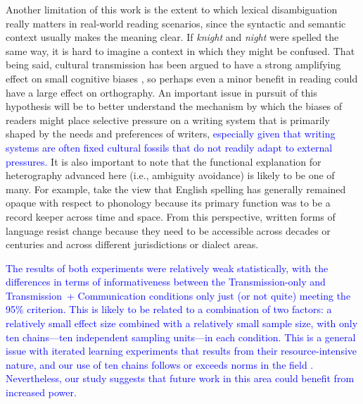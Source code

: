 \documentclass[doc,biblatex]{apa7}
\newcommand\newmaterial[1]{\textcolor{blue}{#1}}
\begin{document}
Another limitation of this work is the extent to which lexical disambiguation really matters in real-world reading scenarios, since the syntactic and semantic context usually makes the meaning clear. If \textit{knight} and \textit{night} were spelled the same way, it is hard to imagine a context in which they might be confused. That being said, cultural transmission has been argued to have a strong amplifying effect on small cognitive biases \parencite{Thompson:2016}, so perhaps even a minor benefit in reading could have a large effect on orthography. An important issue in pursuit of this hypothesis will be to better understand the mechanism by which the biases of readers might place selective pressure on a writing system that is primarily shaped by the needs and preferences of writers, \newmaterial{especially given that writing systems are often fixed cultural fossils that do not readily adapt to external pressures.} It is also important to note that the functional explanation for heterography advanced here (i.e., ambiguity avoidance) is likely to be one of many. For example, \textcite{Stenroos:2016} take the view that English spelling has generally remained opaque with respect to phonology because its primary function was to be a record keeper across time and space. From this perspective, written forms of language resist change because they need to be accessible across decades or centuries and across different jurisdictions or dialect areas.

\newmaterial{The results of both experiments were relatively weak statistically, with the differences in terms of informativeness between the Transmission-only and Transmission~+ Communication conditions only just (or not quite) meeting the 95\% criterion. This is likely to be related to a combination of two factors: a relatively small effect size combined with a relatively small sample size, with only ten chains---ten independent sampling units---in each condition. This is a general issue with iterated learning experiments that results from their resource-intensive nature, and our use of ten chains follows or exceeds norms in the field \parencite[e.g.,][]{Kempe:2015, Kirby:2008, Kirby:2015, Raviv:2018, Roberts:2018, Smith:2010, Tamariz:2015}. Nevertheless, our study suggests that future work in this area could benefit from increased power.}
\end{document}
